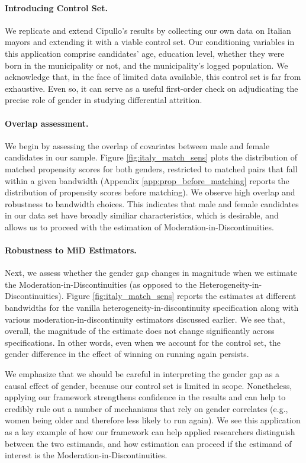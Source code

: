 \documentclass[12pt]{article}
\begin{document}
\paragraph*{Introducing Control Set.} We replicate and extend Cipullo's results by collecting our own data on Italian mayors and extending it with a viable control set. Our conditioning variables in this application comprise candidates' age, education level, whether they were born in the municipality or not, and the municipality's logged population. We acknowledge that, in the face of limited data available, this control set is far from exhaustive. Even so, it can serve as a useful first-order check on adjudicating the precise role of gender in studying differential attrition.

\paragraph*{Overlap assessment.} We begin by assessing the overlap of covariates between male and female candidates in our sample. Figure \ref{fig:italy_match_sens} plots the distribution of matched propensity scores for both genders, restricted to matched pairs that fall within a given bandwidth (Appendix \ref{app:prop_before_matching} reports the distribution of propensity scores before matching). We observe high overlap and robustness to bandwidth choices. This indicates that male and female candidates in our data set have broadly similiar characteristics, which is desirable, and allows us to proceed with the estimation of Moderation-in-Discontinuities.

\paragraph*{Robustness to MiD Estimators.} Next, we assess whether the gender gap changes in magnitude when we estimate the Moderation-in-Discontinuities (as opposed to the  Heterogeneity-in-Discontinuities). Figure \ref{fig:italy_match_sens} reports the estimates at different bandwidths for the vanilla heterogeneity-in-discontinuity specification along with various moderation-in-discontinuity estimators discussed earlier. We see that, overall, the magnitude of the estimate does not change significantly across specifications. In other words, even when we account for the control set, the gender difference in the effect of winning on running again persists.

We emphasize that we should be careful in interpreting the gender gap as a causal effect of gender, because our control set is limited in scope. Nonetheless, applying our framework strengthens confidence in the results and can help to credibly rule out a number of mechanisms that rely on gender correlates (e.g., women being older and therefore less likely to run again). We see this application as a key example of how our framework can help applied researchers distinguish between the two estimands, and how estimation can proceed if the estimand of interest is the Moderation-in-Discontinuities.
\end{document}
